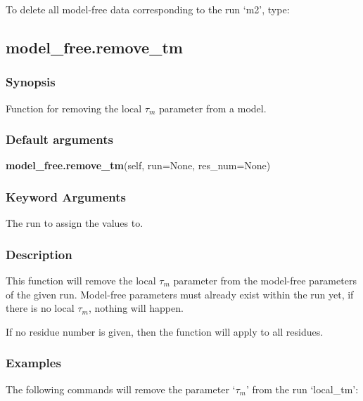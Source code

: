 To delete all model-free data corresponding to the run `m2', type:




\newpage

\subsection{model\_free.remove\_tm}


\subsubsection{Synopsis}

Function for removing the local $\tau_m$ parameter from a model.

\subsubsection{Default arguments}

\textsf{\textbf{model\_free.remove\_tm}(self, run=None, res\_num=None)}


\subsubsection{Keyword Arguments}

  The run to assign the values to.


\subsubsection{Description}

This function will remove the local $\tau_m$ parameter from the model-free parameters of the given
run.  Model-free parameters must already exist within the run yet, if there is no local $\tau_m$,
nothing will happen.

If no residue number is given, then the function will apply to all residues.


\subsubsection{Examples}

The following commands will remove the parameter `$\tau_m$' from the run `local\_tm':




